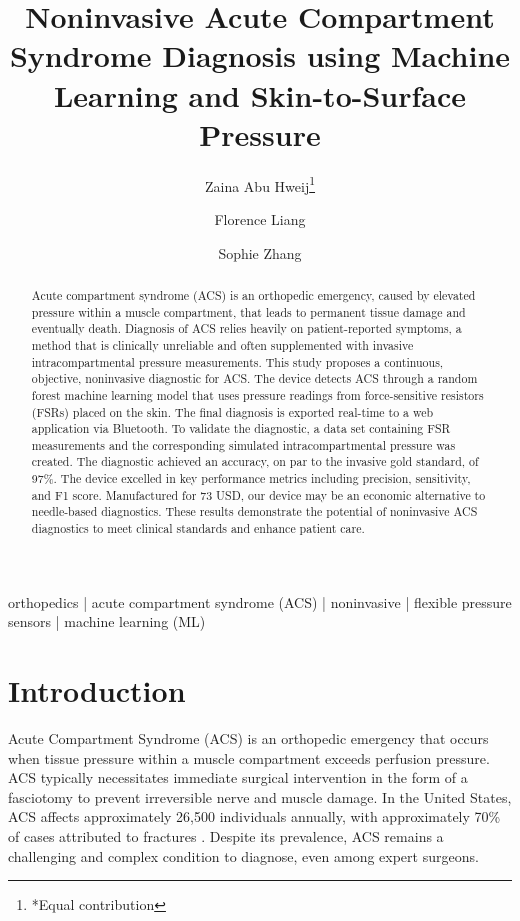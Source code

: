 \documentclass[times, twoside]{zHenriquesLab-StyleBioRxiv}
\begin{document}
\title{Noninvasive Acute Compartment Syndrome Diagnosis using Machine Learning and Skin-to-Surface Pressure}

\author[1*]{Zaina Abu Hweij\thanks{*Equal contribution}}
\author[1*]{Florence Liang}
\author[1*]{Sophie Zhang}


\maketitle

\begin{abstract}
Acute compartment syndrome (ACS) is an orthopedic emergency, caused by elevated pressure within a muscle compartment, that leads to permanent tissue damage and eventually death. Diagnosis of ACS relies heavily on patient-reported symptoms, a method that is clinically unreliable and often supplemented with invasive intracompartmental pressure measurements. This study proposes a continuous, objective, noninvasive diagnostic for ACS. The device detects ACS through a random forest machine learning model that uses pressure readings from force-sensitive resistors (FSRs) placed on the skin. The final diagnosis is exported real-time to a web application via Bluetooth. To validate the diagnostic, a data set containing FSR measurements and the corresponding simulated intracompartmental pressure was created. The diagnostic achieved an accuracy, on par to the invasive gold standard, of 97\%. The device excelled in key performance metrics including precision, sensitivity, and F1 score. Manufactured for 73 USD, our device may be an economic alternative to needle-based diagnostics. These results demonstrate the potential of noninvasive ACS diagnostics to meet clinical standards and enhance patient care.
\end {abstract}

\begin{keywords}
orthopedics | acute compartment syndrome (ACS) | noninvasive | flexible pressure sensors | machine learning (ML)
\end{keywords}
\section*{Introduction}
Acute Compartment Syndrome (ACS) is an orthopedic emergency that occurs when tissue pressure within a muscle compartment exceeds perfusion pressure. ACS typically necessitates immediate surgical intervention in the form of a fasciotomy to prevent irreversible nerve and muscle damage. In the United States, ACS affects approximately 26,500 individuals annually, with approximately 70\% of cases attributed to fractures \cite{giavia2015acute}. Despite its prevalence, ACS remains a challenging and complex condition to diagnose, even among expert surgeons.
\end{document}
